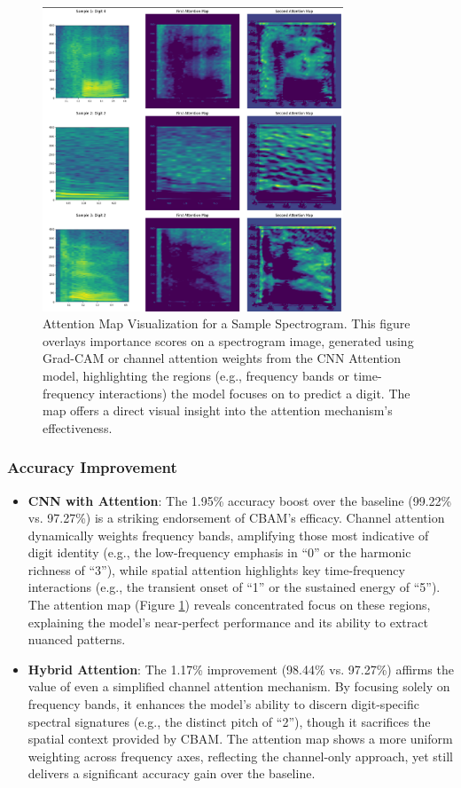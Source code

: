 \documentclass[12pt]{article}
\begin{document}
\begin{figure}[H]
    \centering
    \includegraphics[width=0.8\textwidth]{attention_map.png}
    \caption{Attention Map Visualization for a Sample Spectrogram. This figure overlays importance scores on a spectrogram image, generated using Grad-CAM or channel attention weights from the CNN Attention model, highlighting the regions (e.g., frequency bands or time-frequency interactions) the model focuses on to predict a digit. The map offers a direct visual insight into the attention mechanism's effectiveness.}
    \label{fig:attention_map}
\end{figure}

\subsubsection{Accuracy Improvement}
\begin{itemize}
    \item \textbf{CNN with Attention}: The 1.95\% accuracy boost over the baseline (99.22\% vs. 97.27\%) is a striking endorsement of CBAM's efficacy. Channel attention dynamically weights frequency bands, amplifying those most indicative of digit identity (e.g., the low-frequency emphasis in ``0'' or the harmonic richness of ``3''), while spatial attention highlights key time-frequency interactions (e.g., the transient onset of ``1'' or the sustained energy of ``5''). The attention map (Figure \ref{fig:attention_map}) reveals concentrated focus on these regions, explaining the model's near-perfect performance and its ability to extract nuanced patterns.
    \item \textbf{Hybrid Attention}: The 1.17\% improvement (98.44\% vs. 97.27\%) affirms the value of even a simplified channel attention mechanism. By focusing solely on frequency bands, it enhances the model's ability to discern digit-specific spectral signatures (e.g., the distinct pitch of ``2''), though it sacrifices the spatial context provided by CBAM. The attention map shows a more uniform weighting across frequency axes, reflecting the channel-only approach, yet still delivers a significant accuracy gain over the baseline.
\end{itemize}
\end{document}
